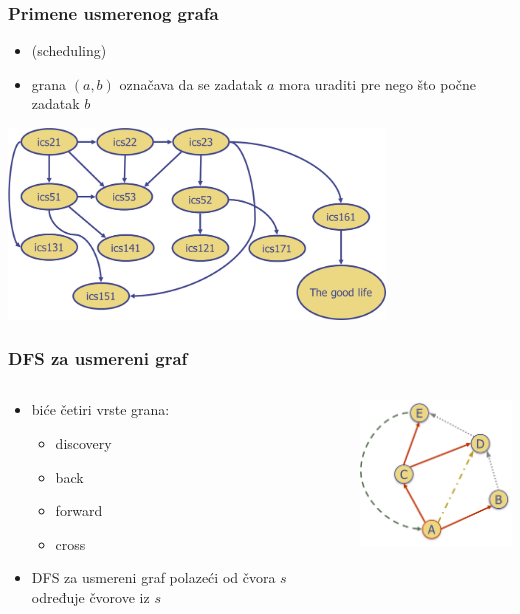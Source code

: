 \documentclass[compress,aspectratio=169]{beamer}
\begin{document}
\begin{frame}[fragile]
  \frametitle{Primene usmerenog grafa}
  \begin{itemize}
    \item {} (scheduling) 
    \item grana $(a,b)$ označava da se zadatak $a$ mora uraditi pre nego
      što počne zadatak $b$
  \end{itemize}
  \begin{center}
    \includegraphics[width=10cm]{asp-14-pic29.png}
  \end{center}
\end{frame}

\begin{frame}[fragile]
  \frametitle{DFS za usmereni graf}
  \begin{columns}
    \begin{column}[t]{6cm}
      \begin{itemize}
        \item biće četiri vrste grana:
        \begin{itemize}
          \item discovery
          \item back
          \item forward
          \item cross
        \end{itemize}
        \item DFS za usmereni graf polazeći od čvora $s$ određuje
          čvorove  iz $s$ 
      \end{itemize}
    \end{column}
    \begin{column}[t]{6cm}
      \begin{center}
        \includegraphics[width=5cm]{asp-14-pic30.png}
      \end{center}
    \end{column}
  \end{columns}
\end{frame}
\end{document}
